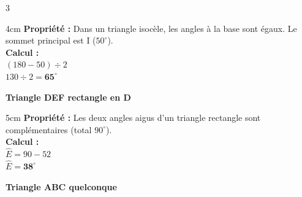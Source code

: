 \documentclass[a4paper]{book}
\begin{document}
{\begin{exerciceNote}{3}
\begin{minipage}{0.32\linewidth}
            \begin{ZoneReponse}{4cm}
                \textbf{Propriété :} Dans un triangle isocèle, les angles à la base sont égaux. Le sommet principal est I ($50^\circ$). \\
                \textbf{Calcul :} \\
                $(180 - 50) \div 2$ \\
                $130 \div 2 = \mathbf{65^\circ}$
            \end{ZoneReponse}
        \end{minipage}
        \vline
        \begin{minipage}{0.32\linewidth}
             \begin{center}        
                \textbf{Triangle DEF rectangle en D} 
                
            \end{center}

            \begin{ZoneReponse}{5cm}
                 \textbf{Propriété :} Les deux angles aigus d'un triangle rectangle sont complémentaires (total $90^\circ$). \\
                 \textbf{Calcul :} \\
                 $\widehat{E} = 90 - 52$ \\
                 $\widehat{E} = \mathbf{38^\circ}$
            \end{ZoneReponse}
        \end{minipage}
        \vline
        \begin{minipage}{0.32\linewidth}
             \begin{center}
                \textbf{Triangle ABC quelconque} 
                

\end{center}
\end{minipage}
\end{exerciceNote}}
\end{document}
